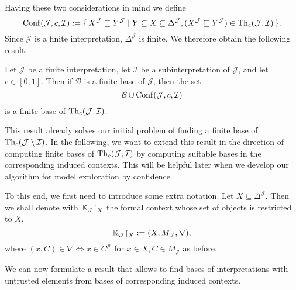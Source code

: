 Having these two considerations in mind we define
\begin{equation*}
  \operatorname{Conf}(\mathcal{J}, c, \mathcal{I}) := {\{\, X^{\mathcal{J}} \sqsubseteq
    Y^{\mathcal{J}} \mid Y \subseteq X \subseteq \Delta^{\mathcal{J}}, (X^{\mathcal{J}}
\sqsubseteq Y^{\mathcal{J}}) \in \operatorname{Th}_{c}(\mathcal{J}, \mathcal{I}) \,\}}.
\end{equation*}
Since $\mathcal{J}$ is a finite interpretation, $\Delta^{\mathcal{J}}$ is finite.  We
therefore obtain the following result.

\begin{Theorem}
  \label{thm:finite-base-of-interpretation-with-untrusted-individuals}
  Let $\mathcal{J}$ be a finite interpretation, let $\mathcal{I}$ be a
  subinterpretation of $\mathcal{J}$, and let $c \in [0,1]$.  Then if $\mathcal{B}$ is a
  finite base of $\mathcal{J}$, then the set
  \begin{equation*}
    \mathcal{B} \cup \operatorname{Conf}(\mathcal{J}, c, \mathcal{I})
  \end{equation*}
  is a finite base of $\operatorname{Th}_{c}(\mathcal{J}, \mathcal{I})$.
\end{Theorem}

This result already solves our initial problem of finding a finite base of
$\operatorname{Th}_{c}(\mathcal{J} \setminus \mathcal{I})$.  In the following, we want to extend this
result in the direction of computing finite bases of $\operatorname{Th}_{c}(\mathcal{J}, \mathcal{I})$
by computing suitable bases in the corresponding induced contexts.  This will be helpful
later when we develop our algorithm for model exploration by confidence.

\def\restricted{\mathord{\upharpoonright}}

To this end, we first need to introduce some extra notation.  Let $X \subseteq
\Delta^{\mathcal{J}}$.  Then we shall denote with $\con K_{\mathcal{J}}\restricted_{X}$
the formal context whose set of objects is restricted to $X$, \ie
\begin{equation*}
  \con K_{\mathcal{J}}\restricted_{X} := (X, M_{\mathcal{J}}, \nabla),
\end{equation*}
where $(x, C) \in \nabla \iff x \in C^{\mathcal{J}}$ for $x \in X, C \in M_{\mathcal{J}}$
as before.

We can now formulate a result that allows to find bases of interpretations with untrusted
elements from bases of corresponding induced contexts.


